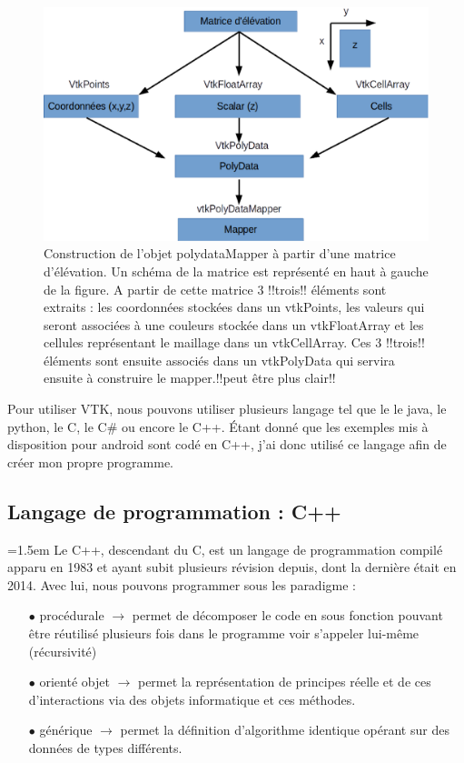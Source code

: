 \documentclass[a4paper,12pt]{article}
\begin{document}
\begin{figure}[h]
	\centering
	\includegraphics[width=15cm]{VTKMeth.eps}  
	\caption{Construction de l'objet polydataMapper à partir d'une matrice d'élévation. Un schéma de la matrice est représenté en haut à gauche de la figure. A partir de cette matrice 3 !!trois!! éléments sont extraits : les coordonnées stockées dans un vtkPoints, les valeurs qui seront associées à une couleurs stockée dans un vtkFloatArray et les cellules représentant le maillage dans un vtkCellArray. Ces 3 !!trois!! éléments sont ensuite associés dans un vtkPolyData qui servira ensuite à construire le mapper.!!peut être plus clair!!}
	\label{fig:VTKMeth}
\end{figure} 

Pour utiliser VTK, nous pouvons utiliser plusieurs langage tel que le le java, le python, le C, le C\# ou encore le C++. Étant donné que les exemples mis à disposition pour android sont codé en C++, j'ai donc utilisé ce langage afin de créer mon propre programme.
	\subsection{Langage de programmation : C++}	
\parindent=1.5em
	Le C++, descendant du C, est un langage de programmation compilé apparu en 1983 et ayant subit plusieurs révision depuis, dont la dernière était en 2014. Avec lui, nous pouvons programmer sous les paradigme : 
\begin{itemize}\setlength{\itemsep}{1mm}
	 \item[$\bullet$] procédurale $\rightarrow$ permet de décomposer le code en sous fonction pouvant être réutilisé plusieurs fois dans le programme voir s'appeler lui-même (récursivité)
	 \item[$\bullet$] orienté objet $\rightarrow$ permet la représentation de principes réelle et de ces d'interactions via des objets informatique et ces méthodes.
	 \item[$\bullet$] générique $\rightarrow$ permet la définition d'algorithme identique opérant sur des données de types différents.
\end{itemize}
 
\end{document}
